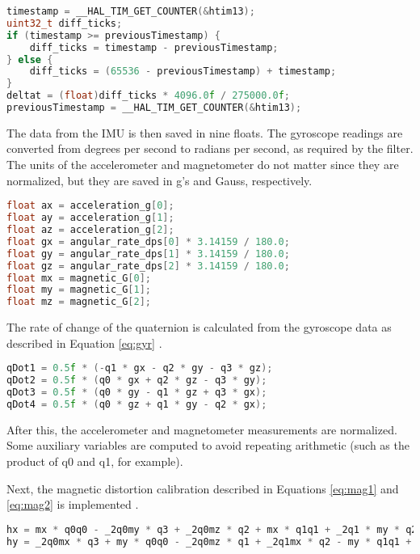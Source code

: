 \documentclass[12pt,a4paper]{report}
\begin{document}
\begin{lstlisting}[language=C++]
timestamp = __HAL_TIM_GET_COUNTER(&htim13);
uint32_t diff_ticks;
if (timestamp >= previousTimestamp) {
	diff_ticks = timestamp - previousTimestamp;
} else {
	diff_ticks = (65536 - previousTimestamp) + timestamp;
}
deltat = (float)diff_ticks * 4096.0f / 275000.0f;
previousTimestamp = __HAL_TIM_GET_COUNTER(&htim13);
\end{lstlisting}

The data from the IMU is then saved in nine floats. The gyroscope readings are converted from degrees per second to radians per second, as required by the filter. The units of the accelerometer and magnetometer do not matter since they are normalized, but they are saved in g’s and Gauss, respectively.

\begin{lstlisting}[language=C++]
float ax = acceleration_g[0];
float ay = acceleration_g[1];
float az = acceleration_g[2];
float gx = angular_rate_dps[0] * 3.14159 / 180.0;
float gy = angular_rate_dps[1] * 3.14159 / 180.0;
float gz = angular_rate_dps[2] * 3.14159 / 180.0;
float mx = magnetic_G[0];
float my = magnetic_G[1];
float mz = magnetic_G[2];
\end{lstlisting}

The rate of change of the quaternion is calculated from the gyroscope data as described in Equation \ref{eq:gyr} \cite{xiotech}.

\begin{lstlisting}[language=C++]
qDot1 = 0.5f * (-q1 * gx - q2 * gy - q3 * gz);
qDot2 = 0.5f * (q0 * gx + q2 * gz - q3 * gy);
qDot3 = 0.5f * (q0 * gy - q1 * gz + q3 * gx);
qDot4 = 0.5f * (q0 * gz + q1 * gy - q2 * gx);
\end{lstlisting}

After this, the accelerometer and magnetometer measurements are normalized. Some auxiliary variables are computed to avoid repeating arithmetic (such as the product of q0 and q1, for example). 

Next, the magnetic distortion calibration described in Equations \ref{eq:mag1} and \ref{eq:mag2} is implemented \cite{xiotech}.

\begin{lstlisting}[language=C++]
hx = mx * q0q0 - _2q0my * q3 + _2q0mz * q2 + mx * q1q1 + _2q1 * my * q2 + _2q1 * mz * q3 - mx * q2q2 - mx * q3q3;
hy = _2q0mx * q3 + my * q0q0 - _2q0mz * q1 + _2q1mx * q2 - my * q1q1 + my * q2q2 + _2q2 * mz * q3 - my * q3q3;
\end{lstlisting}
\end{document}
